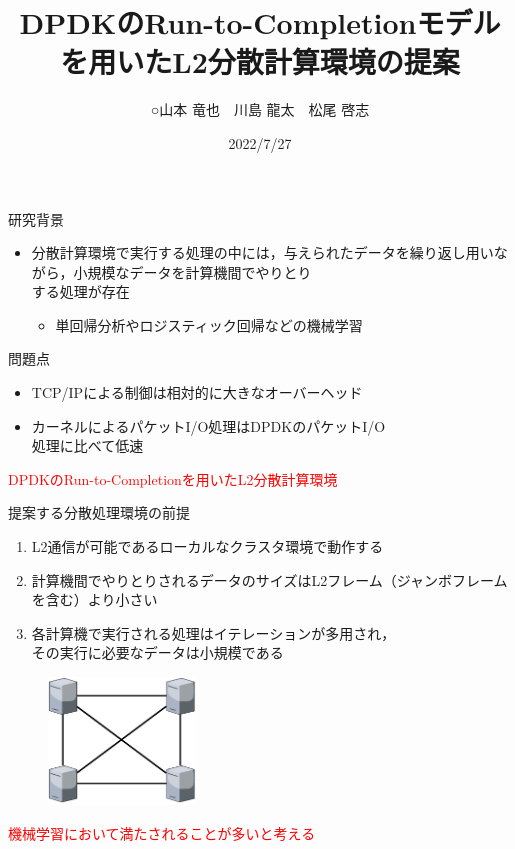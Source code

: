\documentclass[12pt, unicode]{beamer}
\title[]{DPDKのRun-to-Completionモデルを用いたL2分散計算環境の提案}
\author[]{○山本 竜也　川島 龍太　松尾 啓志}
\institute[]{名古屋工業大学大学院}
\date[]{2022/7/27}
\begin{document}
\begin{frame}
  \maketitle
\end{frame}

\begin{frame}{研究背景}
  \begin{itemize}
    \item 分散計算環境で実行する処理の中には，与えられたデータを繰り返し用いながら，小規模なデータを計算機間でやりとり\\する処理が存在
    \begin{itemize}
      \item 単回帰分析やロジスティック回帰などの機械学習
    \end{itemize}
  \end{itemize}

  \begin{block}{問題点}
    \begin{itemize}
      \item TCP/IPによる制御は相対的に大きなオーバーヘッド
      \item カーネルによるパケットI/O処理はDPDKのパケットI/O\\処理に比べて低速
    \end{itemize}
  \end{block}

  \begin{center}
    \large{\textcolor{red}{DPDKのRun-to-Completionを用いたL2分散計算環境}}
  \end{center}
\end{frame}

\begin{frame}{提案する分散処理環境の前提}
  \begin{enumerate}
    \item L2通信が可能であるローカルなクラスタ環境で動作する
    \item 計算機間でやりとりされるデータのサイズはL2フレーム（ジャンボフレームを含む）より小さい
    \item 各計算機で実行される処理はイテレーションが多用され，\\その実行に必要なデータは小規模である
  \end{enumerate}

  \begin{figure}[h]
    \centering
    \includegraphics[width=0.35\textwidth]{pictures/Framework.pdf}
  \end{figure}

  \begin{center}
    \large{\textcolor{red}{機械学習において満たされることが多いと考える}}
  \end{center}
\end{frame}
\end{document}

